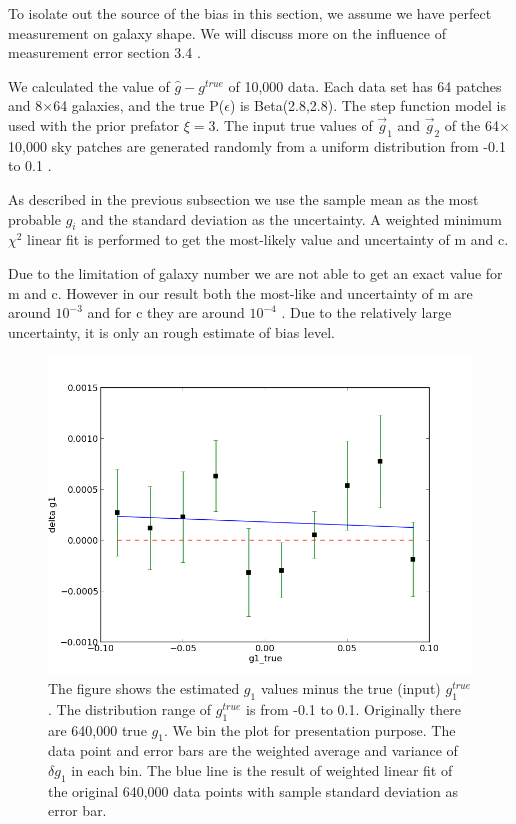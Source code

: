 \documentclass[useAMS,usenatbib]{mn2e}
\begin{document}
To isolate out the source of the bias in this section, we assume we have perfect measurement on galaxy shape.
We will discuss more on the influence of measurement error section 3.4 .

We calculated the value of $\hat{g}-g^{true}$ of 10,000 data. Each data set has 64 patches and 8$\times$64 galaxies, and
the true P($\epsilon$) is Beta(2.8,2.8). The step function model is used with the prior prefator $\xi=3$.
The input true values of $\vec{g}_{1}$ and $\vec{g}_{2}$ of the 64$\times$10,000 sky patches are generated randomly from a uniform distribution from -0.1 to 0.1 . 

As described in the previous subsection we use the sample mean as the most probable $g_{i}$ and 
the standard deviation as the uncertainty. A weighted minimum $\chi^{2}$ linear fit is performed to get the
most-likely value and uncertainty of m and c.
 
Due to the limitation of galaxy number we are not able to get an exact value for m and c. However in our result 
both the most-like and uncertainty of m are around $10^{-3}$ and for c they are around $10^{-4}$ . Due to the
relatively large uncertainty, it is only an rough estimate of bias level.
\begin{figure}
\includegraphics[scale=0.5]{fig/g1bias}

\caption{The figure shows the estimated $g_{1}$ values minus the true (input)
$g_{1}^{true}$. The distribution range of $g_{1}^{true}$ is from
-0.1 to 0.1. Originally there are 640,000 true $g_{1}$. We bin the
plot for presentation purpose. The data point and error bars are the weighted
 average and  variance of $\delta g_{1}$ in each bin. The blue
line is the result of weighted linear fit of the original 640,000 data points
with sample standard deviation as error bar.}
\end{figure}
\end{document}

